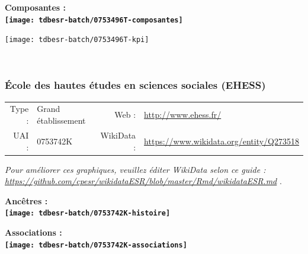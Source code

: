 \documentclass[12pt,french,]{article}
\begin{document}
\hrulefill

\begin{center} \bf Composantes : \\  
\texttt{[image: tdbesr-batch/0753496T-composantes]} \end{center}

\begin{center}\texttt{[image: tdbesr-batch/0753496T-kpi]} \end{center}\checkoddpage

\ifoddpage \fi ~\newpage  

\hypertarget{uxe9cole-des-hautes-uxe9tudes-en-sciences-sociales-ehess}{%
\subsubsection{École des hautes études en sciences sociales
(EHESS)}\label{uxe9cole-des-hautes-uxe9tudes-en-sciences-sociales-ehess}}

\begin{tabular*}{\textwidth}{rp{5cm}rl}  
\hline  
Type : & Grand établissement & Web : &\href{http://www.ehess.fr/}{http://www.ehess.fr/} \\  
UAI : & 0753742K & WikiData : & \href{https://www.wikidata.org/entity/Q273518}{https://www.wikidata.org/entity/Q273518} \\  
\hline  
\end{tabular*}

\textit{\scriptsize Pour améliorer ces graphiques, veuillez éditer WikiData selon ce guide :  \href{https://github.com/cpesr/wikidataESR/blob/master/Rmd/wikidataESR.md}{https://github.com/cpesr/wikidataESR/blob/master/Rmd/wikidataESR.md}}
.

\vspace{1cm}  
\begin{minipage}[b]{0.50\textwidth}\begin{center} \bf Ancêtres : \\  
\texttt{[image: tdbesr-batch/0753742K-histoire]} \end{center}\end{minipage}\begin{minipage}[b]{0.50\textwidth}\begin{center} \bf Associations : \\  
\texttt{[image: tdbesr-batch/0753742K-associations]} \end{center}\end{minipage}

\hrulefill
\end{document}
